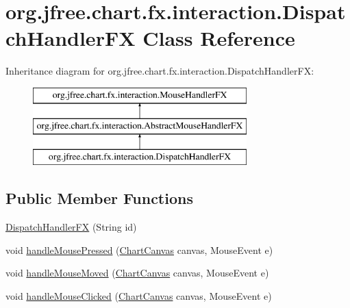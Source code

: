 \hypertarget{classorg_1_1jfree_1_1chart_1_1fx_1_1interaction_1_1_dispatch_handler_f_x}{}\section{org.\+jfree.\+chart.\+fx.\+interaction.\+Dispatch\+Handler\+FX Class Reference}
\label{classorg_1_1jfree_1_1chart_1_1fx_1_1interaction_1_1_dispatch_handler_f_x}
Inheritance diagram for org.\+jfree.\+chart.\+fx.\+interaction.\+Dispatch\+Handler\+FX\+:\begin{figure}[H]
\begin{center}
\leavevmode
\includegraphics[height=3.000000cm]{classorg_1_1jfree_1_1chart_1_1fx_1_1interaction_1_1_dispatch_handler_f_x}
\end{center}
\end{figure}
\subsection*{Public Member Functions}
\begin{DoxyCompactItemize}
\item 
\mbox{\hyperlink{classorg_1_1jfree_1_1chart_1_1fx_1_1interaction_1_1_dispatch_handler_f_x_aae3dcdf4f90e2f10823fe5f23b654ded}{Dispatch\+Handler\+FX}} (String id)
\item 
void \mbox{\hyperlink{classorg_1_1jfree_1_1chart_1_1fx_1_1interaction_1_1_dispatch_handler_f_x_aec52d7abb43d55b8cde1e459d20c7ffa}{handle\+Mouse\+Pressed}} (\mbox{\hyperlink{classorg_1_1jfree_1_1chart_1_1fx_1_1_chart_canvas}{Chart\+Canvas}} canvas, Mouse\+Event e)
\item 
void \mbox{\hyperlink{classorg_1_1jfree_1_1chart_1_1fx_1_1interaction_1_1_dispatch_handler_f_x_a7509ebbee5de20b7cc4ad500cab4b488}{handle\+Mouse\+Moved}} (\mbox{\hyperlink{classorg_1_1jfree_1_1chart_1_1fx_1_1_chart_canvas}{Chart\+Canvas}} canvas, Mouse\+Event e)
\item 
void \mbox{\hyperlink{classorg_1_1jfree_1_1chart_1_1fx_1_1interaction_1_1_dispatch_handler_f_x_a9a58cb60ccd2dba2c76b19f91fe7d55a}{handle\+Mouse\+Clicked}} (\mbox{\hyperlink{classorg_1_1jfree_1_1chart_1_1fx_1_1_chart_canvas}{Chart\+Canvas}} canvas, Mouse\+Event e)
\end{DoxyCompactItemize}


